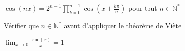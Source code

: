 \documentclass[a4paper,11pt,fleqn]{article}
\begin{document}
\begin{ToolBox}[title={Outils}]
\tcbitem[title=Formule] $\cos(nx) = 2^{n-1}\prod_{k=0}^{n-1}\cos(x+\frac{k\pi}{n})$ pour tout $n \in \mathbb{N}^*$

\tcbitem[title=Attention !] Vérifier que $n \in \mathbb{N}^*$ avant d'appliquer le théorème de Viète

\tcbitem[title=Limite]  $\lim_{x \to 0} \frac{\sin(x)}{x} = 1$

\end{ToolBox}
\end{document}
